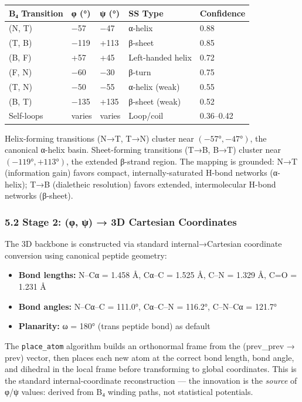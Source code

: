 \documentclass[12pt,a4paper]{article}
\begin{document}
\begin{longtable}[]{@{}lllll@{}}
\toprule
B₄ Transition & φ (°) & ψ (°) & SS Type & Confidence\tabularnewline
\midrule
\endhead
(N, T) & −57 & −47 & α-helix & 0.88\tabularnewline
(T, B) & −119 & +113 & β-sheet & 0.85\tabularnewline
(B, F) & +57 & +45 & Left-handed helix & 0.72\tabularnewline
(F, N) & −60 & −30 & β-turn & 0.75\tabularnewline
(T, N) & −50 & −55 & α-helix (weak) & 0.55\tabularnewline
(B, T) & −135 & +135 & β-sheet (weak) & 0.52\tabularnewline
Self-loops & varies & varies & Loop/coil & 0.36--0.42\tabularnewline
\bottomrule
\end{longtable}

Helix-forming transitions (N→T, T→N) cluster near \((-57°, -47°)\), the
canonical α-helix basin. Sheet-forming transitions (T→B, B→T) cluster
near \((-119°, +113°)\), the extended β-strand region. The mapping is
grounded: N→T (information gain) favors compact, internally-saturated
H-bond networks (α-helix); T→B (dialetheic resolution) favors extended,
intermolecular H-bond networks (β-sheet).

\hypertarget{stage-2-ux3c6-ux3c8-3d-cartesian-coordinates}{%
\subsubsection{5.2 Stage 2: (φ, ψ) → 3D Cartesian
Coordinates}\label{stage-2-ux3c6-ux3c8-3d-cartesian-coordinates}}

The 3D backbone is constructed via standard internal→Cartesian
coordinate conversion using canonical peptide geometry:

\begin{itemize}
\tightlist
\item
  \textbf{Bond lengths:} N--Cα = 1.458 Å, Cα--C = 1.525 Å, C--N = 1.329
  Å, C=O = 1.231 Å
\item
  \textbf{Bond angles:} N--Cα--C = 111.0°, Cα--C--N = 116.2°, C--N--Cα =
  121.7°
\item
  \textbf{Planarity:} ω = 180° (trans peptide bond) as default
\end{itemize}

The \texttt{place\_atom} algorithm builds an orthonormal frame from the
(prev\_prev → prev) vector, then places each new atom at the correct
bond length, bond angle, and dihedral in the local frame before
transforming to global coordinates. This is the standard
internal-coordinate reconstruction --- the innovation is the
\emph{source} of φ/ψ values: derived from B₄ winding paths, not
statistical potentials.
\end{document}
